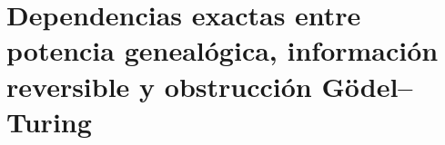 
\chapter{Dependencias exactas entre potencia genealógica, información reversible y obstrucción Gödel–Turing}
\label{app:integracion-vn64-controles}

\HMTDemoteHeadings

\HMTRestoreHeadings
